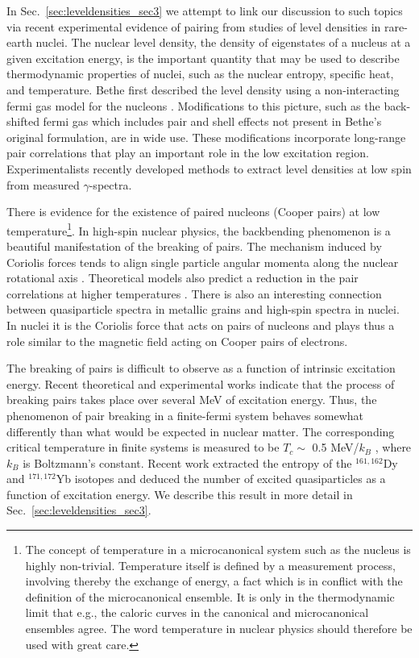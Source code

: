 \documentclass[rmp,aps,floatfix]{revtex4}
\begin{document}
In Sec.~\ref{sec:leveldensities_sec3} we attempt to link our discussion
to such topics via 
recent experimental evidence of pairing from studies
of level densities in rare-earth nuclei. 
The nuclear level density, the density of eigenstates of a nucleus
at a given excitation energy, is the important quantity that may be
used to describe thermodynamic properties of nuclei, such as the
nuclear entropy, specific heat, and temperature.
Bethe first described the level density using a
non-interacting fermi gas model
for the nucleons \cite{bethe1}. Modifications to this picture, such as the
back-shifted fermi gas which includes pair and
shell effects \cite{back_shift,newton56}
not present in Bethe's original formulation, are in
wide use.  These modifications incorporate 
long-range pair correlations that play an important role
in the low excitation region.
Experimentalists recently developed methods
\cite{oslo1,oslo2} to extract level densities at low spin from
measured $\gamma$-spectra. 

There is evidence for the existence of paired nucleons 
(Cooper pairs) at low temperature\footnote{The concept of temperature
in a microcanonical system such as the nucleus is highly non-trivial. 
Temperature itself is defined by a measurement process, involving
thereby the exchange of energy, a fact which is in conflict with the definition
of the  microcanonical ensemble. It is only in the thermodynamic 
limit that e.g., the caloric curves in the canonical and microcanonical
ensembles agree. The word temperature in nuclear physics should therefore
be used with great care.}. In high-spin nuclear physics, 
the backbending phenomenon is a beautiful manifestation of 
the breaking of pairs. The mechanism induced by Coriolis 
forces tends to align single particle angular momenta along 
the nuclear rotational axis 
\cite{stephenssimon,johnson1971,ried80,faessler76}. 
Theoretical models also 
predict a reduction in the pair correlations at 
higher temperatures \cite{mottelson60,muhlhans83,dossing95}.
There is also an interesting connection between quasiparticle spectra
in metallic grains and high-spin spectra in nuclei. In nuclei it is the 
Coriolis force that acts on pairs of nucleons and plays thus a
role similar to the magnetic field acting on Cooper pairs of electrons.

The breaking of pairs is difficult to observe as a 
function of intrinsic excitation energy. Recent 
theoretical \cite{dossing95} and experimental \cite{oslo2,oslo3} works 
indicate that the process of breaking pairs takes place 
over several MeV of excitation energy. Thus, the 
phenomenon of pair breaking in a finite-fermi system behaves 
somewhat differently than what would be expected in nuclear matter. 
The corresponding critical 
temperature in finite systems is measured to be 
$T_c \sim $ 0.5 MeV/$k_B$ \cite{schiller2001}, 
where $k_B$ is Boltzmann's constant.
Recent work extracted the entropy of the 
$^{161,162}$Dy and $^{171,172}$Yb isotopes and deduced the 
number of excited quasiparticles as a function of excitation energy. 
We describe this result in more detail in 
Sec.~\ref{sec:leveldensities_sec3}.
\end{document}
